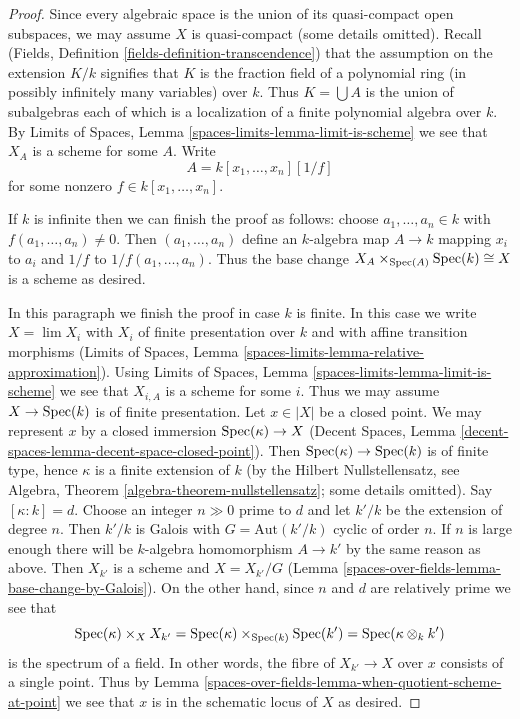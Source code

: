 \begin{proof}
Since every algebraic space is the union of its quasi-compact open
subspaces, we may assume $X$ is quasi-compact (some details omitted).
Recall (Fields, Definition \ref{fields-definition-transcendence})
that the assumption on the extension $K/k$ signifies that
$K$ is the fraction field of a polynomial ring (in possibly infinitely
many variables) over $k$. Thus $K = \bigcup A$ is the union of subalgebras
each of which is a localization of a finite polynomial algebra over $k$.
By Limits of Spaces, Lemma \ref{spaces-limits-lemma-limit-is-scheme}
we see that $X_A$ is a scheme for some $A$. Write
$$
A = k[x_1, \ldots, x_n][1/f]
$$
for some nonzero $f \in k[x_1, \ldots, x_n]$.

\medskip\noindent
If $k$ is infinite then we can finish the proof as follows: choose
$a_1, \ldots, a_n \in k$ with $f(a_1, \ldots, a_n) \not = 0$.
Then $(a_1, \ldots, a_n)$ define an $k$-algebra map $A \to k$
mapping $x_i$ to $a_i$ and $1/f$ to $1/f(a_1, \ldots, a_n)$.
Thus the base change $X_A \times_{\operatorname{Spec}(A)} \operatorname{Spec}(k) \cong X$ is a
scheme as desired.

\medskip\noindent
In this paragraph we finish the proof in case $k$ is finite. In this
case we write $X = \lim X_i$ with $X_i$ of finite presentation over $k$
and with affine transition morphisms
(Limits of Spaces, Lemma \ref{spaces-limits-lemma-relative-approximation}).
Using Limits of Spaces, Lemma \ref{spaces-limits-lemma-limit-is-scheme}
we see that $X_{i, A}$ is a scheme for some $i$. Thus we may assume
$X \to \operatorname{Spec}(k)$ is of finite presentation. Let $x \in |X|$ be a closed
point. We may represent $x$ by a closed immersion
$\operatorname{Spec}(\kappa) \to X$
(Decent Spaces, Lemma \ref{decent-spaces-lemma-decent-space-closed-point}).
Then $\operatorname{Spec}(\kappa) \to \operatorname{Spec}(k)$ is of finite type, hence $\kappa$
is a finite extension of $k$ (by the Hilbert Nullstellensatz, see
Algebra, Theorem \ref{algebra-theorem-nullstellensatz};
some details omitted). Say $[\kappa : k] = d$. Choose an integer
$n \gg 0$ prime to $d$ and let $k'/k$ be the extension
of degree $n$. Then $k'/k$ is Galois with $G = \text{Aut}(k'/k)$
cyclic of order $n$. If $n$ is large enough there will be $k$-algebra
homomorphism $A \to k'$ by the same reason as above.
Then $X_{k'}$ is a scheme and $X = X_{k'}/G$
(Lemma \ref{spaces-over-fields-lemma-base-change-by-Galois}).
On the other hand, since $n$ and $d$ are relatively prime we see that
$$
\operatorname{Spec}(\kappa) \times_{X} X_{k'} =
\operatorname{Spec}(\kappa) \times_{\operatorname{Spec}(k)} \operatorname{Spec}(k') =
\operatorname{Spec}(\kappa \otimes_k k')
$$
is the spectrum of a field. In other words, the fibre of $X_{k'} \to X$
over $x$ consists of a single point. Thus by
Lemma \ref{spaces-over-fields-lemma-when-quotient-scheme-at-point}
we see that $x$ is in the schematic locus of $X$ as desired.
\end{proof}

